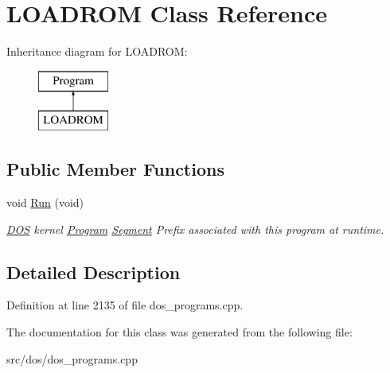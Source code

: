 \hypertarget{classLOADROM}{\section{L\-O\-A\-D\-R\-O\-M Class Reference}
\label{classLOADROM}
}
Inheritance diagram for L\-O\-A\-D\-R\-O\-M\-:\begin{figure}[H]
\begin{center}
\leavevmode
\includegraphics[height=2.000000cm]{classLOADROM}
\end{center}
\end{figure}
\subsection*{Public Member Functions}
\begin{DoxyCompactItemize}
\item 
\hypertarget{classLOADROM_a0d95e173ed8a5de685f6161ade6068f6}{void \hyperlink{classLOADROM_a0d95e173ed8a5de685f6161ade6068f6}{Run} (void)}\label{classLOADROM_a0d95e173ed8a5de685f6161ade6068f6}

\begin{DoxyCompactList}\small\item\em \hyperlink{classDOS}{D\-O\-S} kernel \hyperlink{classProgram}{Program} \hyperlink{structSegment}{Segment} Prefix associated with this program at runtime. \end{DoxyCompactList}\end{DoxyCompactItemize}


\subsection{Detailed Description}


Definition at line 2135 of file dos\-\_\-programs.\-cpp.



The documentation for this class was generated from the following file\-:\begin{DoxyCompactItemize}
\item 
src/dos/dos\-\_\-programs.\-cpp\end{DoxyCompactItemize}
